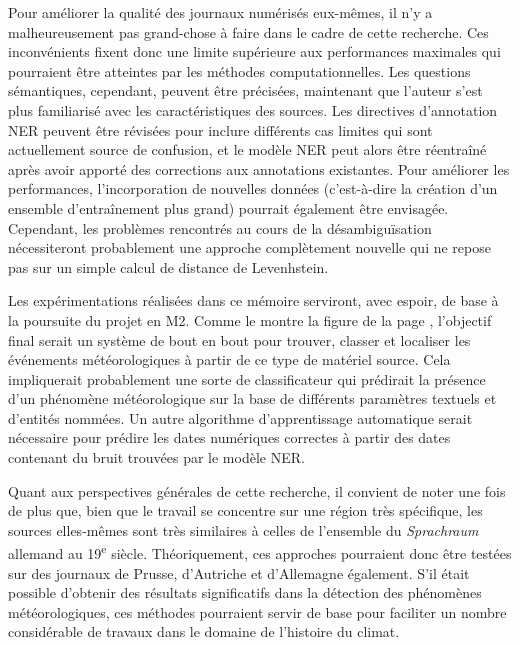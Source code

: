 \documentclass[a4paper,twoside,12pt]{article}
\begin{document}
Pour améliorer la qualité des journaux numérisés eux-mêmes, il n'y a malheureusement pas grand-chose à faire dans le cadre de cette recherche. Ces inconvénients fixent donc une limite supérieure aux performances maximales qui pourraient être atteintes par les méthodes computationnelles. Les questions sémantiques, cependant, peuvent être précisées, maintenant que l'auteur s'est plus familiarisé avec les caractéristiques des sources. Les directives d'annotation NER peuvent être révisées pour inclure différents cas limites qui sont actuellement source de confusion, et le modèle NER peut alors être réentraîné après avoir apporté des corrections aux annotations existantes. Pour améliorer les performances, l'incorporation de nouvelles données (c'est-à-dire la création d'un ensemble d'entraînement plus grand) pourrait également être envisagée. Cependant, les problèmes rencontrés au cours de la désambiguïsation nécessiteront probablement une approche complètement nouvelle qui ne repose pas sur un simple calcul de distance de Levenhstein.

Les expérimentations réalisées dans ce mémoire serviront, avec espoir, de base à la poursuite du projet en M2. Comme le montre la figure de la page \pageref{fig:workflow}, l'objectif final serait un système de bout en bout pour trouver, classer et localiser les événements météorologiques à partir de ce type de matériel source. Cela impliquerait probablement une sorte de classificateur qui prédirait la présence d'un phénomène météorologique sur la base de différents paramètres textuels et d'entités nommées. Un autre algorithme d'apprentissage automatique serait nécessaire pour prédire les dates numériques correctes à partir des dates contenant du bruit trouvées par le modèle NER.

Quant aux perspectives générales de cette recherche, il convient de noter une fois de plus que, bien que le travail se concentre sur une région très spécifique, les sources elles-mêmes sont très similaires à celles de l'ensemble du \textit{Sprachraum} allemand au 19\textsuperscript{e} siècle. Théoriquement, ces approches pourraient donc être testées sur des journaux de Prusse, d'Autriche et d'Allemagne également. S'il était possible d'obtenir des résultats significatifs dans la détection des phénomènes météorologiques, ces méthodes pourraient servir de base pour faciliter un nombre considérable de travaux dans le domaine de l'histoire du climat.

\clearpage

\clearpage
\end{document}
